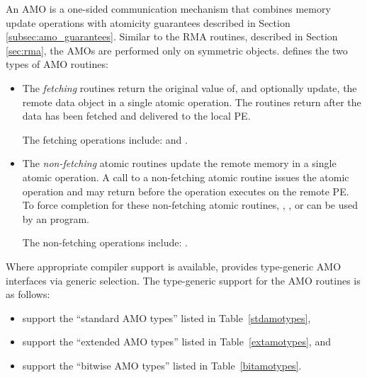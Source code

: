 An \ac{AMO} is a one-sided communication mechanism that combines 
memory update operations with atomicity guarantees described in Section
\ref{subsec:amo_guarantees}.  Similar to the \ac{RMA} routines, described in
Section \ref{sec:rma}, the \acp{AMO} are performed only on symmetric objects.
\openshmem defines the two types of \ac{AMO} routines:
\begin{itemize}
\item
The \textit{fetching} routines  return the original value of, 
and optionally update, the remote data object in a single atomic operation.  The routines
return after the data has been fetched and delivered to the local \ac{PE}.

The fetching operations include:
 and
.

\item
The \textit{non-fetching}  atomic routines 
update the remote memory in a single atomic operation.  A call to a non-fetching atomic routine 
issues the atomic operation and may return before the operation executes on the remote \ac{PE}.
To force completion for these non-fetching atomic routines,
, , or  can
be used by an \openshmem program.

The non-fetching operations include:
.
\end{itemize}

Where appropriate compiler support is available, \openshmem provides
type-generic \ac{AMO} interfaces via \Cstd[11] generic selection.
The type-generic support for the \ac{AMO} routines is as follows:

\begin{itemize}
\item {} support
      the ``standard \ac{AMO} types'' listed in Table~\ref{stdamotypes},
\item {} support
      the ``extended \ac{AMO} types'' listed in Table~\ref{extamotypes}, and
\item {}
      support the ``bitwise \ac{AMO} types'' listed in Table~\ref{bitamotypes}.
\end{itemize}

